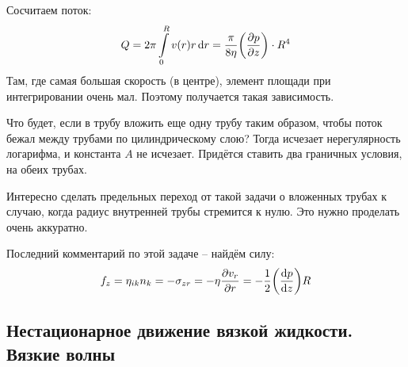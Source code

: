 Сосчитаем поток:
\begin{equation}
    Q=2\pi \int\limits_0^R v(r) r \dd{r} =
    \frac{\pi}{8\eta} \qty(\pdv{p}{z})\cdot R^4
\end{equation}
Там, где самая большая скорость (в центре), элемент площади при интегрировании очень мал. Поэтому получается такая зависимость.

Что будет, если в трубу вложить еще одну трубу таким образом, чтобы поток бежал между трубами по цилиндрическому слою? Тогда исчезает нерегулярность логарифма, и константа $A$ не исчезает. Придётся ставить два граничных условия, на обеих трубах.

Интересно сделать предельных переход от такой задачи о вложенных трубах к случаю, когда радиус внутренней трубы  стремится к нулю. Это нужно проделать очень аккуратно.

Последний комментарий по этой задаче -- найдём силу:
\begin{equation}
    f_z = \eta_{ik} n_k = -\sigma_{zr} = -\eta \pdv{v_r}{r}=
    -\frac{1}{2} \qty(\dv{p}{z})R
\end{equation}

\newpage
\subsection{Нестационарное движение вязкой жидкости. Вязкие волны}

